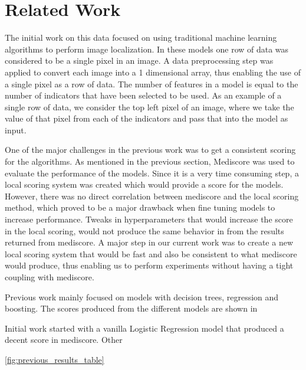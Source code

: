 \section{Related Work}

The initial work on this data focused on using traditional machine learning algorithms to perform image localization. In these models one 
row of data was considered to be a single pixel in an image. A data preprocessing step was applied to convert each image into a 1 dimensional
array, thus enabling the use of a single pixel as a row of data. The number of features in a model is equal to the number of indicators 
that have been selected to be used. As an example of a single row of data, we consider the top left pixel of an image, where we take the 
value of that pixel from each of the indicators and pass that into the model as input.

One of the major challenges in the previous work was to get a consistent scoring for the algorithms. As mentioned in the previous section, 
Mediscore was used to evaluate the performance of the models. Since it is a very time consuming step, a local scoring system was created which 
would provide a score for the models. However, there was no direct correlation between mediscore and the local scoring method, which proved 
to be a major drawback when fine tuning models to increase performance. Tweaks in hyperparameters that would increase the score in the 
local scoring, would not produce the same behavior in from the results returned from mediscore. A major step in our current work was to 
create a new local scoring system that would be fast and also be consistent to what mediscore would produce, thus enabling us to perform 
experiments without having a tight coupling with mediscore.

Previous work mainly focused on models with decision trees, regression and boosting. The scores produced from the different models are shown in 

Initial work started with a vanilla Logistic Regression model that produced a decent score in mediscore. Other 


\ref{fig:previous_results_table}